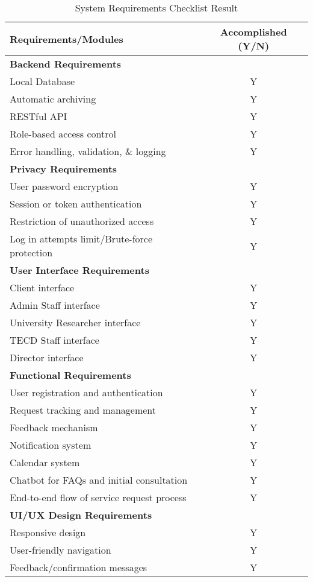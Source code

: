 \begin{table}[ht]
	\centering
	\begin{tabular}{|p{10cm}|c|}
		\hline
		\textbf{Requirements/Modules} & \textbf{Accomplished (Y/N)} \\
		\hline
		\multicolumn{2}{|l|}{\textbf{Backend Requirements}} \\
		\hline
		Local Database & Y \\
		Automatic archiving & Y \\
		RESTful API & Y \\
		Role-based access control & Y \\
		Error handling, validation, \& logging & Y \\
		\hline
		\multicolumn{2}{|l|}{\textbf{Privacy Requirements}} \\
		\hline
		User password encryption & Y \\
		Session or token authentication & Y \\
		Restriction of unauthorized access & Y \\
		Log in attempts limit/Brute-force protection & Y \\
		\hline
		\multicolumn{2}{|l|}{\textbf{User Interface Requirements}} \\
		\hline
		Client interface & Y \\
		Admin Staff interface & Y \\
		University Researcher interface & Y \\
		TECD Staff interface & Y \\
		Director interface & Y \\
		\hline
		\multicolumn{2}{|l|}{\textbf{Functional Requirements}} \\
		\hline
		User registration and authentication & Y \\
		Request tracking and management & Y \\
		Feedback mechanism & Y \\
		Notification system & Y \\
		Calendar system & Y \\
		Chatbot for FAQs and initial consultation & Y \\
		End-to-end flow of service request process & Y \\
		\hline
		\multicolumn{2}{|l|}{\textbf{UI/UX Design Requirements}} \\
		\hline
		Responsive design & Y \\
		User-friendly navigation & Y \\
		Feedback/confirmation messages & Y \\
		\hline
	\end{tabular}
	\caption{System Requirements Checklist Result}
	\label{tab:summary_results}
\end{table}